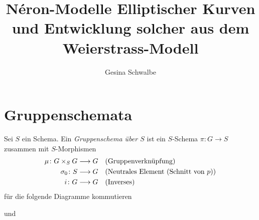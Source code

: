 \documentclass[german]{scrreprt}
\title{Néron-Modelle Elliptischer Kurven 
  und Entwicklung solcher aus dem Weierstrass-Modell}
\author{Gesina Schwalbe}
\begin{document}
\maketitle
\tableofcontents


\chapter{Gruppenschemata}
\begin{Definition}[$S$-Gruppenschema]
  Sei $S$ ein Schema. Ein \emph{Gruppenschema über $S$} ist ein
  $S$-Schema $\pi\colon G\to S$ zusammen mit $S$-Morphismen
  \begin{align*}
    \mu\colon G\times_S G &\longrightarrow G
    &&\text{(Gruppenverknüpfung)}\\
    \sigma_0\colon S&\longrightarrow G 
    &&\text{(Neutrales Element (Schnitt von $p$))}\\
    i\colon G &\longrightarrow G    
    &&\text{(Inverses)}
  \end{align*}
  für die folgende Diagramme kommutieren
  \begin{description}[labelwidth=4cm]
  \item[Neutrales Element]
    und
  \item[Inverses]

\end{description}
\end{Definition}
\end{document}
